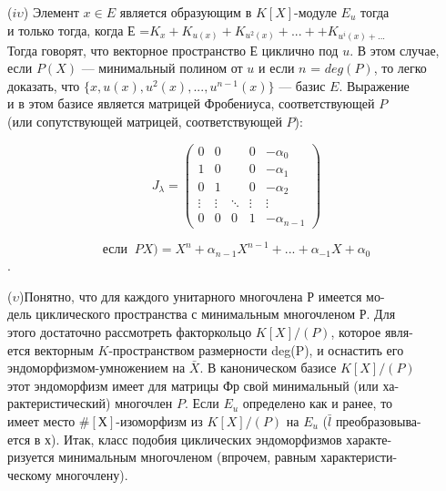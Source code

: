 \documentclass{../template/mai_book}
\begin{document}
\medskip

($\mathit{i}\upsilon $) Элемент $x\in E$ является образующим в $K[X]$-модуле $E_u$ тогда\\
и только тогда, когда Е =$ K_x + K_{u(x)} + K_{u^2(x)}+...++ K_{u^i(x)+...} $\\ 
Тогда говорят, что векторное пространство $Е$ циклично под $u$. В этом 
случае, если $P(X)$ — минимальный полином от $u$ и если $n$ = $deg(P)$, то 
легко доказать, что $\{x, u(x), u^2(x),..., u^{n-1}(x)\}$ — базис $E$. Выражение\\
и в этом базисе является матрицей Фробениуса, соответствующей $P$ \\
(или сопутствующей матрицей, соответствующей $P$): 

\medskip

$$J_{\lambda} = \begin{pmatrix}
0 & 0 & \; & 0 & -\alpha_0 \\
1 & 0 & \; & 0 & -\alpha_1 \\
0 & 1 & \; & 0 & -\alpha_2 \\
\vdots & \vdots & \ddots & \vdots & \vdots \\
0 & 0 & 0 & 1 & -\alpha_{n-1}
\end{pmatrix}
$$


$$\text{если} \;\;PX) = X^n+\alpha_{n-1}X^{n-1}+... +\alpha_{-1}X+\alpha_0$$.

\pagebreak

($\upsilon$)Понятно, что для каждого унитарного многочлена Р имеется 
мо-\\дель циклического пространства с минимальным многочленом Р. Для\\ 
этого достаточно рассмотреть факторкольцо $K[X]/(P)$, которое 
явля-\\ется векторным $\mathit{K}$-пространством размерности deg(P), и оснастить его \\эндоморфизмом-умножением на $\bar{X}$. В каноническом базисе $K[X]/(P)$\\
этот эндоморфизм имеет для матрицы Фр свой минимальный (или 
ха-\\рактеристический) многочлен $P$. Если $E_u$ определено как и ранее, то\\ 
имеет место $\# [Х]$-изоморфизм из $K[X]/(P)$ на $E_u$ ($\bar{l}$ 
преобразовыва-\\ется в х). Итак, класс подобия циклических эндоморфизмов 
характе-\\ризуется минимальным многочленом (впрочем, равным 
характеристи-\\ческому многочлену).
\end{document}

